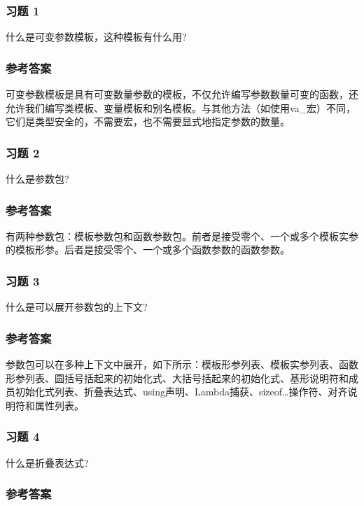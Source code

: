 \subsubsection{习题 1}

什么是可变参数模板，这种模板有什么用?

\subsubsection{参考答案}

可变参数模板是具有可变数量参数的模板，不仅允许编写参数数量可变的函数，还允许我们编写类模板、变量模板和别名模板。与其他方法（如使用va\_宏）不同，它们是类型安全的，不需要宏，也不需要显式地指定参数的数量。


\subsubsection{习题 2}

什么是参数包?

\subsubsection{参考答案}

有两种参数包：模板参数包和函数参数包。前者是接受零个、一个或多个模板实参的模板形参。后者是接受零个、一个或多个函数参数的函数参数。

\subsubsection{习题 3}

什么是可以展开参数包的上下文?

\subsubsection{参考答案}

参数包可以在多种上下文中展开，如下所示：模板形参列表、模板实参列表、函数形参列表、圆括号括起来的初始化式、大括号括起来的初始化式、基形说明符和成员初始化式列表、折叠表达式、using声明、Lambda捕获、sizeof…操作符、对齐说明符和属性列表。

\subsubsection{习题 4}

什么是折叠表达式?

\subsubsection{参考答案}

